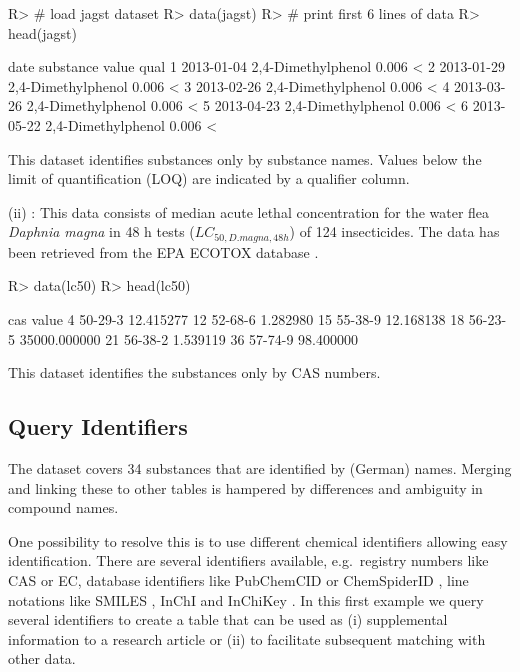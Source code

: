 \documentclass[article, shortnames]{jss}\usepackage[]{graphicx}\usepackage[]{color}
\begin{document}
\begin{CodeChunk}
\begin{CodeInput}
R> # load jagst dataset
R> data(jagst)
R> # print first 6 lines of data
R> head(jagst)
\end{CodeInput}
\begin{CodeOutput}
        date          substance value qual
1 2013-01-04 2,4-Dimethylphenol 0.006    <
2 2013-01-29 2,4-Dimethylphenol 0.006    <
3 2013-02-26 2,4-Dimethylphenol 0.006    <
4 2013-03-26 2,4-Dimethylphenol 0.006    <
5 2013-04-23 2,4-Dimethylphenol 0.006    <
6 2013-05-22 2,4-Dimethylphenol 0.006    <
\end{CodeOutput}
\end{CodeChunk}

This dataset identifies substances only by substance names. Values below the limit of quantification (LOQ) are indicated by a qualifier column.

(ii) : This data consists of median acute lethal concentration for the water flea \textit{Daphnia magna} in 48 h tests ($LC_{50, D.magna, 48h}$) of 124 insecticides.
The data has been retrieved from the EPA ECOTOX database \citep{epa_2016}.

\begin{CodeChunk}
\begin{CodeInput}
R> data(lc50)
R> head(lc50)
\end{CodeInput}
\begin{CodeOutput}
       cas        value
4  50-29-3    12.415277
12 52-68-6     1.282980
15 55-38-9    12.168138
18 56-23-5 35000.000000
21 56-38-2     1.539119
36 57-74-9    98.400000
\end{CodeOutput}
\end{CodeChunk}

This dataset identifies the substances only by CAS numbers.


\subsection[Query Identifiers]{Query Identifiers}
The  dataset covers 34 substances that are identified by (German) names.
Merging and linking these to other tables is hampered by differences and ambiguity in compound names.

One possibility to resolve this is to use different chemical identifiers allowing easy identification.
There are several identifiers available, e.g.\ registry numbers like CAS or EC, database identifiers like PubChemCID \citep{Kim_2016} or ChemSpiderID \citep{pence_chemspider:_2010}, line notations like SMILES \citep{Weininger_1990}, InChI and InChiKey \citep{Heller_McNaught_Pletnev_Stein_Tchekhovskoi_2015}. 
In this first example we query several identifiers to create a table that can be used as (i) supplemental information to a research article or (ii) to facilitate subsequent matching with other data.
\end{document}
